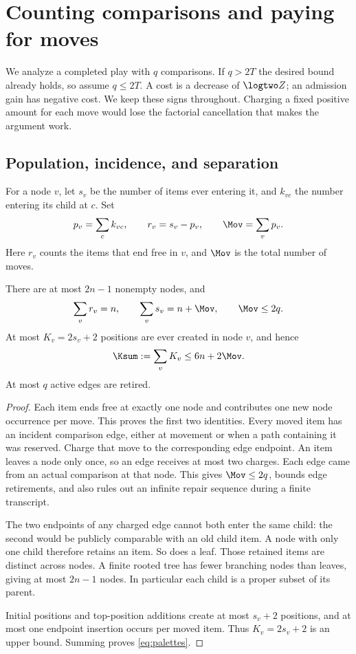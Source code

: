 \section{Counting comparisons and paying for moves}
\label{sec:accounting}

We analyze a completed play with $q$ comparisons. If $q>2T$ the desired
bound already holds, so assume $q\leq2T$.
A cost is a decrease of $\logtwo Z$; an admission gain has negative cost.
We keep these signs throughout. Charging a fixed positive amount for each
move would lose the factorial cancellation that makes the argument work.

\subsection{Population, incidence, and separation}

For a node $v$, let $s_v$ be the number of items ever entering it, and
$k_{vc}$ the number entering its child at $c$. Set
\[
 p_v=\sum_c k_{vc},\qquad r_v=s_v-p_v,\qquad
 \Mov=\sum_v p_v .
\]
Here $r_v$ counts the items that end free in $v$, and $\Mov$ is the total
number of moves.

\begin{lemma}
\label{lem:population}
There are at most $2n-1$ nonempty nodes, and
\begin{equation}
 \sum_v r_v=n,\qquad \sum_v s_v=n+\Mov,\qquad \Mov\leq2q.
\label{eq:population}
\end{equation}
At most $K_v=2s_v+2$ positions are ever created in node $v$, and hence
\begin{equation}
                    \Ksum:=\sum_vK_v\leq6n+2\Mov.
\label{eq:palettes}
\end{equation}
At most $q$ active edges are retired.
\end{lemma}
\begin{proof}
Each item ends free at exactly one node and contributes one new node
occurrence per move. This proves the first two identities.
Every moved item has an incident comparison edge, either at movement or
when a path containing it was reserved. Charge that move to the corresponding
edge endpoint. An item leaves a node only once, so an edge receives at most
two charges. Each edge came from an actual comparison at that node.
This gives $\Mov\leq2q$, bounds edge retirements, and also rules out an
infinite repair sequence during a finite transcript.

The two endpoints of any charged edge cannot both enter the same child:
the second would be publicly comparable with an old child item.
A node with only one child therefore retains an item. So does a leaf.
Those retained items are distinct across nodes. A finite rooted tree has
fewer branching nodes than leaves, giving at most $2n-1$ nodes.
In particular each child is a proper subset of its parent.

Initial positions and top-position additions create at most $s_v+2$
positions, and at most one endpoint insertion occurs per moved item.
Thus $K_v=2s_v+2$ is an upper bound. Summing proves \eqref{eq:palettes}.
\end{proof}

